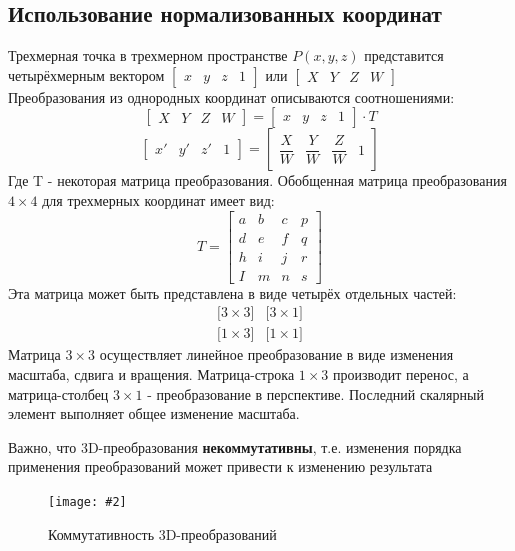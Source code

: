 \documentclass[a4paper, 14pt]{extarticle}
\newcommand{\screenshot}[3]{
	\begin{figure}[h]
		\centering
		\texttt{[image: \#2]}
		\caption{#3}
	\end{figure}
}
\begin{document}
\subsection{Использование нормализованных координат}
Трехмерная точка в трехмерном пространстве $P(x,y,z)$ представится четырёхмерным вектором
$\begin{bmatrix}
x & y & z & 1
\end{bmatrix}$
 или 
$\begin{bmatrix}
X & Y & Z & W
\end{bmatrix}$\\
\newpage
Преобразования из однородных координат описываются соотношениями:
$$\begin{bmatrix} X & Y & Z & W \end{bmatrix} = 
\begin{bmatrix} x & y & z & 1 \end{bmatrix} \cdot T$$
$$\begin{bmatrix} x' & y' & z' & 1 \end{bmatrix} = 
\begin{bmatrix} \dfrac{X}{W} & \dfrac{Y}{W} & \dfrac{Z}{W} & 1 \end{bmatrix}
$$
Где T - некоторая матрица преобразования. Обобщенная матрица преобразования $4\times4$ для трехмерных координат имеет вид:
$$ T = \begin{bmatrix}
a & b & c & p\\
d & e & f & q\\
h & i & j & r\\
I & m & n & s
\end{bmatrix} $$
Эта матрица может быть представлена в виде четырёх отдельных частей:
$$
\begin{array}{c|c}
\lbrack 3 \times 3 \rbrack & \lbrack 3 \times 1 \rbrack \\ 
\hline
\lbrack 1 \times 3 \rbrack & \lbrack 1 \times 1 \rbrack
\end{array}
$$
Матрица $3 \times 3$ осуществляет линейное преобразование в виде изменения масштаба, сдвига и вращения. Матрица-строка $1 \times 3 $ производит перенос, а матрица-столбец $3 \times 1$ - преобразование в перспективе. Последний скалярный элемент выполняет общее изменение масштаба.

Важно, что 3D-преобразования \textbf{некоммутативны}, т.е. изменения порядка применения преобразований может привести к изменению результата
\screenshot{width=9cm}{l4/S008.jpg}{Коммутативность 3D-преобразований}
\end{document}
